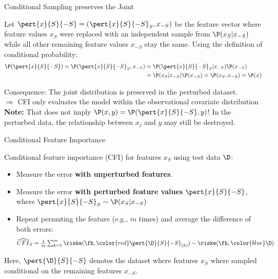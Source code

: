 \documentclass[11pt,compress,t,notes=noshow, aspectratio=169, xcolor=table]{beamer}
\begin{document}
 
 \begin{frame}{Conditional Sampling preserves the Joint}
 
 Let $\pert{x}{S}{-S} = (\pert{x}{S}{-S}_S, x_{-S})$ be the feature vector where feature values $x_S$ were replaced with an independent sample from $\P(x_S|x_{-S})$ while all other remaining feature values $x_{-S}$ stay the same. %
 Using the definition of conditional probability:
%
\begin{align*}
  \P(\pert{x}{S}{-S}) = \P(\pert{x}{S}{-S}_S, x_{-S}) &= \P(\pert{x}{S}{-S}_S|x_{-S}) \P(x_{-S})\\
   &= \P(x_S|x_{-S}) \P(x_{-S}) =  \P(x_S, x_{-S})= \P(x)
\end{align*}
\pause

Consequence: The joint distribution is preserved in the perturbed dataset.\\
$\Rightarrow$ CFI only evaluates the model within the observational covariate distribution\\
 \lz
 \textbf{Note:} That does not imply $\P(x,y) = \P(\pert{x}{S}{-S}, y)$! In the perturbed data, the relationship between $x_j$ and $y$ may still be destroyed.\\
 \end{frame}



\begin{frame}{Conditional Feature Importance  }
\normalsize

Conditional feature importance (CFI) for features $x_S$ using test data $\D$:
\begin{itemize}
  \item Measure the error \color{blue}\textbf{with unperturbed features}\color{black}.
  \item Measure the error \color{red}\textbf{with perturbed feature values} \color{black} $\pert{x}{S}{-S}$, where $\pert{x}{S}{-S}_S \sim \P(x_S|x_{-S})$
  \item Repeat permuting the feature (e.g., $m$ times) and average the difference of both errors: 
$$\widehat{CFI}_S = \tfrac{1}{m} \textstyle\sum\nolimits_{k = 1}^{m} \riske (\fh, {\color{red}\pert{\D}{S}{-S}_{(k)}}) - \riske (\fh, {\color{blue}\D})$$
\end{itemize}

Here, $\pert{\D}{S}{-S}$ denotes the dataset where features $x_S$ where sampled conditional on the remaining features $x_{-S}$.


\end{frame}
\end{document}
